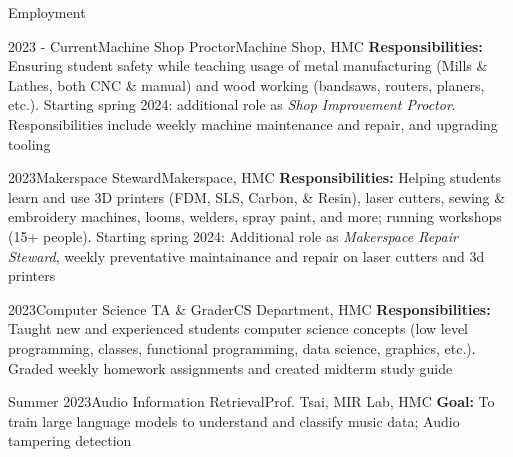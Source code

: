 \documentclass[]{mcdowellcv}
\begin{document}
\begin{cvsection}{Employment}
	\begin{cvsubsection}{2023 - Current}{Machine Shop Proctor}{Machine Shop, HMC}
		\vspace{0.2em}
		\textbf{Responsibilities:} Ensuring student safety while teaching usage of metal manufacturing (Mills \& Lathes, both CNC \& manual) and wood working (bandsaws, routers, planers, etc.). Starting spring 2024: additional role as \textit{Shop Improvement Proctor}. Responsibilities include weekly machine maintenance and repair, and upgrading tooling
	\end{cvsubsection}
	\begin{cvsubsection}{2023}{Makerspace Steward}{Makerspace, HMC}
		\vspace{0.2em}
		\textbf{Responsibilities:} Helping students learn and use 3D printers (FDM, SLS, Carbon, \& Resin), laser cutters, sewing \& embroidery machines, looms, welders, spray paint, and more; running workshops (15+ people). Starting spring 2024: Additional role as \textit{Makerspace Repair Steward}, weekly preventative maintainance and repair on laser cutters and 3d printers
	\end{cvsubsection}
	\begin{cvsubsection}{2023}{Computer Science TA \& Grader}{CS Department, HMC}
		\vspace{0.2em}
		\textbf{Responsibilities:} Taught new and experienced students computer science concepts (low level programming, classes, functional programming, data science, graphics, etc.). Graded weekly homework assignments and created midterm study guide
	\end{cvsubsection}
	\begin{cvsubsection}{Summer 2023}{Audio Information Retrieval}{Prof. Tsai, MIR Lab, HMC}
		\textbf{Goal:} To train large language models to understand and classify music data; Audio tampering detection
		\begin{itemize}

\end{itemize}
\end{cvsubsection}
\end{cvsection}
\end{document}
